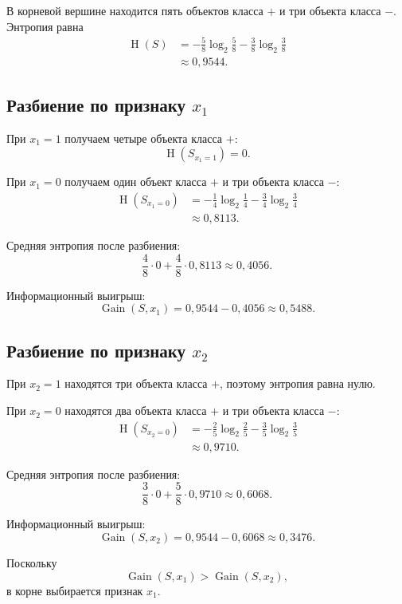 \documentclass[12pt,a4paper]{article}
\theoremstyle{plain}
\theoremstyle{definition}
\theoremstyle{remark}
\newcommand{\Entropy}{\operatorname{H}}
\newcommand{\Gain}{\operatorname{Gain}}
\begin{document}
В корневой вершине находится пять объектов класса $+$ и три объекта
класса $-$. Энтропия равна
\[
\begin{aligned}
    \Entropy(S)
    &=
    -\frac{5}{8}\log_2\frac{5}{8}
    -\frac{3}{8}\log_2\frac{3}{8}
    \\
    &\approx 0{,}9544.
\end{aligned}
\]

\subsection*{Разбиение по признаку $x_1$}

При $x_1=1$ получаем четыре объекта класса $+$:
\[
    \Entropy(S_{x_1=1})=0.
\]

При $x_1=0$ получаем один объект класса $+$ и три объекта класса $-$:
\[
\begin{aligned}
    \Entropy(S_{x_1=0})
    &=
    -\frac14\log_2\frac14
    -\frac34\log_2\frac34
    \\
    &\approx 0{,}8113.
\end{aligned}
\]

Средняя энтропия после разбиения:
\[
    \frac48\cdot 0
    +
    \frac48\cdot 0{,}8113
    \approx 0{,}4056.
\]

Информационный выигрыш:
\[
    \Gain(S,x_1)
    =
    0{,}9544-0{,}4056
    \approx 0{,}5488.
\]

\subsection*{Разбиение по признаку $x_2$}

При $x_2=1$ находятся три объекта класса $+$, поэтому энтропия равна
нулю.

При $x_2=0$ находятся два объекта класса $+$ и три объекта класса $-$:
\[
\begin{aligned}
    \Entropy(S_{x_2=0})
    &=
    -\frac25\log_2\frac25
    -\frac35\log_2\frac35
    \\
    &\approx 0{,}9710.
\end{aligned}
\]

Средняя энтропия после разбиения:
\[
    \frac38\cdot 0
    +
    \frac58\cdot 0{,}9710
    \approx 0{,}6068.
\]

Информационный выигрыш:
\[
    \Gain(S,x_2)
    =
    0{,}9544-0{,}6068
    \approx 0{,}3476.
\]

Поскольку
\[
    \Gain(S,x_1)>\Gain(S,x_2),
\]
в корне выбирается признак $x_1$.
\end{document}
